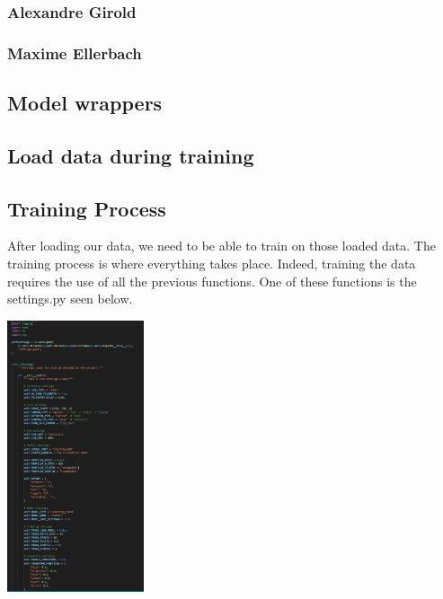 \documentclass[12pt]{article}
\begin{document}
\subsubsection{Alexandre Girold}
\subsubsection{Maxime Ellerbach}


\subsection{Model wrappers}

\subsection{Load data during training}

\subsection{Training Process}

After loading our data, we need to be able to train on those loaded data. The training process is where everything takes place. Indeed, training the data requires the use of all the previous functions. One of these functions is the settings.py seen below. 
\centerline{\includegraphics[height=8cm]{../../docs/settings pt1.png}}
\end{document}

